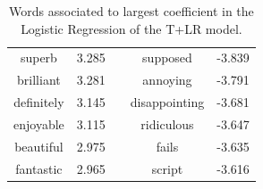 \begin{table}[h]
\begin{tabular}{ccccc}
    \multicolumn{1}{c|}{superb}         & 3.285     &  & \multicolumn{1}{c|}{supposed}         & -3.839  \\ \cline{1-2} \cline{4-5} 
    \multicolumn{1}{c|}{brilliant}      & 3.281     &  & \multicolumn{1}{c|}{annoying}         & -3.791  \\ \cline{1-2} \cline{4-5} 
    \multicolumn{1}{c|}{definitely}     & 3.145     &  & \multicolumn{1}{c|}{disappointing}    & -3.681  \\ \cline{1-2} \cline{4-5} 
    \multicolumn{1}{c|}{enjoyable}      & 3.115     &  & \multicolumn{1}{c|}{ridiculous}       & -3.647  \\ \cline{1-2} \cline{4-5} 
    \multicolumn{1}{c|}{beautiful}      & 2.975     &  & \multicolumn{1}{c|}{fails}            & -3.635  \\ \cline{1-2} \cline{4-5} 
    \multicolumn{1}{c|}{fantastic}      & 2.965     &  & \multicolumn{1}{c|}{script}           & -3.616  \\ \cline{1-2} \cline{4-5} 
    \end{tabular}
    \caption{Words associated to largest coefficient in the Logistic Regression of the T+LR model.}
    \label{tab:logreg}
\end{table}
    





